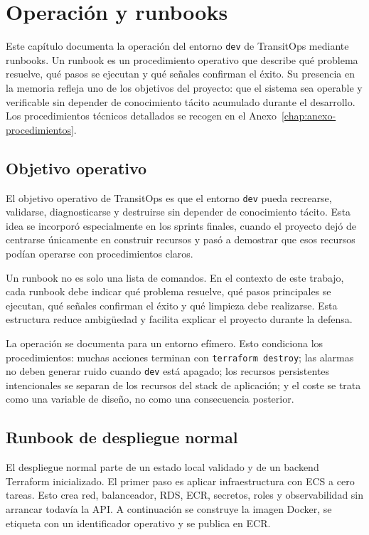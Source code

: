 \chapter{Operación y runbooks}
\label{chap:operacion-runbooks}

Este capítulo documenta la operación del entorno \texttt{dev} de TransitOps mediante runbooks. Un runbook es un procedimiento operativo que describe qué problema resuelve, qué pasos se ejecutan y qué señales confirman el éxito. Su presencia en la memoria refleja uno de los objetivos del proyecto: que el sistema sea operable y verificable sin depender de conocimiento tácito acumulado durante el desarrollo. Los procedimientos técnicos detallados se recogen en el Anexo~\ref{chap:anexo-procedimientos}.

\section{Objetivo operativo}
\label{sec:objetivo-operativo}

El objetivo operativo de TransitOps es que el entorno \texttt{dev} pueda recrearse, validarse, diagnosticarse y destruirse sin depender de conocimiento tácito. Esta idea se incorporó especialmente en los sprints finales, cuando el proyecto dejó de centrarse únicamente en construir recursos y pasó a demostrar que esos recursos podían operarse con procedimientos claros.

Un runbook no es solo una lista de comandos. En el contexto de este trabajo, cada runbook debe indicar qué problema resuelve, qué pasos principales se ejecutan, qué señales confirman el éxito y qué limpieza debe realizarse. Esta estructura reduce ambigüedad y facilita explicar el proyecto durante la defensa.

La operación se documenta para un entorno efímero. Esto condiciona los procedimientos: muchas acciones terminan con \texttt{terraform destroy}; las alarmas no deben generar ruido cuando \texttt{dev} está apagado; los recursos persistentes intencionales se separan de los recursos del stack de aplicación; y el coste se trata como una variable de diseño, no como una consecuencia posterior.

\section{Runbook de despliegue normal}
\label{sec:runbook-deploy-normal}

El despliegue normal parte de un estado local validado y de un backend Terraform inicializado. El primer paso es aplicar infraestructura con ECS a cero tareas. Esto crea red, balanceador, RDS, ECR, secretos, roles y observabilidad sin arrancar todavía la API. A continuación se construye la imagen Docker, se etiqueta con un identificador operativo y se publica en ECR.

